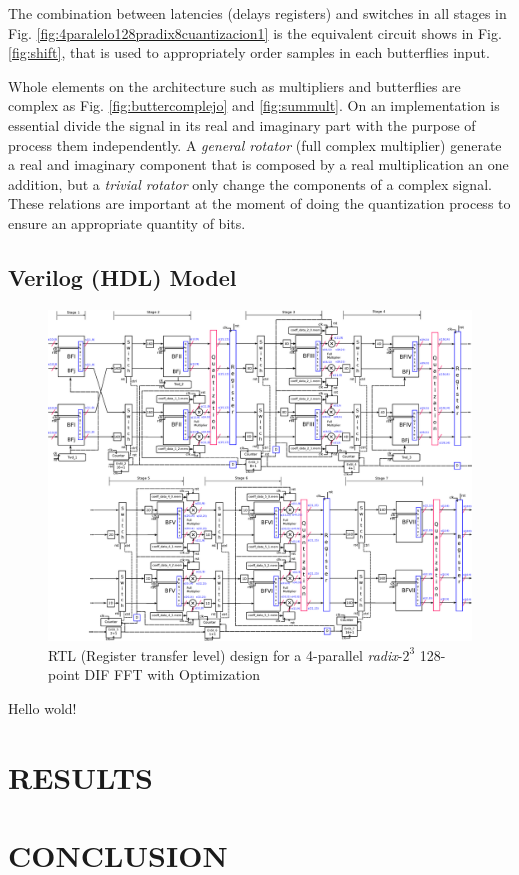\documentclass[journal,comsoc]{IEEEtran}
\begin{document}
The combination between latencies (delays registers) and switches in all stages in Fig. \ref{fig:4paralelo128pradix8cuantizacion1} is the equivalent circuit shows in Fig. \ref{fig:shift}, that is used to appropriately order samples in each butterflies input.

Whole elements on the architecture such as multipliers and butterflies are complex as Fig. \ref{fig:buttercomplejo} and \ref{fig:summult}. On an implementation is essential divide the signal in its real and imaginary part with the purpose of process them independently. A \textit{general rotator} (full complex multiplier) generate a real and imaginary component that is composed by a real multiplication an one addition, but a \textit{trivial rotator} only change the components of a complex signal. These relations are important at the moment of doing the quantization process to ensure an appropriate quantity of bits.
\subsection{Verilog (HDL) Model} 
\begin{figure}[t!]
	\centering
	\includegraphics[width=\linewidth]{Diagramas/V5_esquema_p.eps}
	\caption{RTL (Register transfer level) design for a 4-parallel \textit{radix}-$2^3$ 128-point DIF FFT with Optimization}
	\label{fig:v5esquemap}
\end{figure}

Hello wold!



\section{RESULTS}



\section{CONCLUSION}





\end{document}
